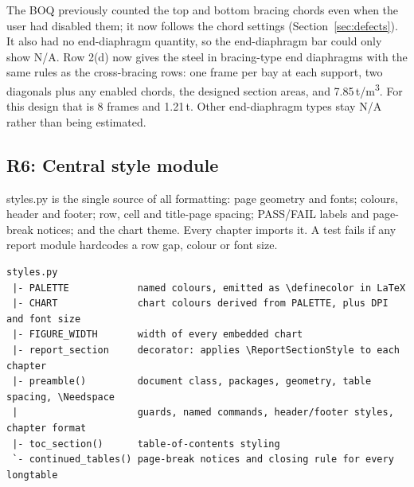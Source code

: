 \documentclass[11pt,a4paper]{article}
\newcommand{\breakus}{\textunderscore\allowbreak}
\newcommand{\file}[1]{{\ttfamily\let\_\breakus #1}}
\begin{document}
The BOQ previously counted the top and bottom bracing chords even when the user had disabled them; it now follows the
chord settings (Section~\ref{sec:defects}). It also had no end-diaphragm quantity, so the end-diaphragm bar
could only show N/A. Row 2(d) now gives the steel in bracing-type end diaphragms with the same rules as the
cross-bracing rows: one frame per bay at each support, two diagonals plus any enabled chords, the designed section
areas, and 7.85\,t/m\textsuperscript{3}. For this design that is 8 frames and 1.21\,t. Other end-diaphragm types
stay N/A rather than being estimated.

\subsection{R6: Central style module}\label{sec:r6}

\file{styles.py} is the single source of all formatting: page geometry and fonts; colours, header and footer;
row, cell and title-page spacing; PASS/FAIL labels and page-break notices; and the chart theme. Every chapter imports it. A test fails if
any report module hardcodes a row gap, colour or font size.

\begin{lstlisting}
styles.py
 |- PALETTE            named colours, emitted as \definecolor in LaTeX
 |- CHART              chart colours derived from PALETTE, plus DPI and font size
 |- FIGURE_WIDTH       width of every embedded chart
 |- report_section     decorator: applies \ReportSectionStyle to each chapter
 |- preamble()         document class, packages, geometry, table spacing, \Needspace
 |                     guards, named commands, header/footer styles, chapter format
 |- toc_section()      table-of-contents styling
 `- continued_tables() page-break notices and closing rule for every longtable
\end{lstlisting}
\end{document}
